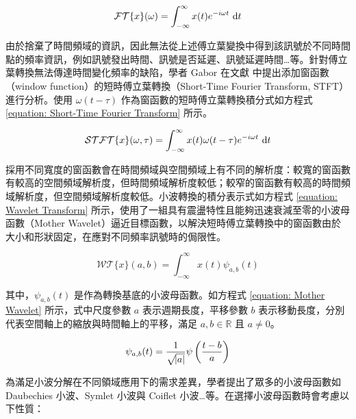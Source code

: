 \begin{equation}\label{equation: Fourier Transform}
  \mathcal{FT}\{ x \} (\omega) = \int_{-\infty}^{\infty} x(t) e^{-i \omega t} \, \mathop{}\!\mathrm{d} t
\end{equation}

由於捨棄了時間頻域的資訊，因此無法從上述傅立葉變換中得到該訊號於不同時間點的頻率資訊，例如訊號發出時間、訊號是否延遲、訊號延遲時間…等。針對傅立葉轉換無法傳達時間變化頻率的缺陷，學者 Gabor 在文獻 \cite{mallat1989theory} 中提出添加窗函數（window function）的短時傅立葉轉換（Short-Time Fourier Transform, STFT）進行分析。使用 $\omega(t - \tau)$ 作為窗函數的短時傅立葉轉換積分式如方程式 \eqref{equation: Short-Time Fourier Transform} 所示。

\begin{equation}\label{equation: Short-Time Fourier Transform}
  \mathcal{STFT}\{ x \} (\omega, \tau) = \int_{-\infty}^{\infty} x(t) \omega(t - \tau) e^{-i \omega t} \, \mathop{}\!\mathrm{d} t
\end{equation}

採用不同寬度的窗函數會在時間頻域與空間頻域上有不同的解析度：較寬的窗函數有較高的空間頻域解析度，但時間頻域解析度較低；較窄的窗函數有較高的時間頻域解析度，但空間頻域解析度較低。小波轉換的積分表示式如方程式 \eqref{equation: Wavelet Transform} 所示，使用了一組具有震盪特性且能夠迅速衰減至零的小波母函數（Mother Wavelet）逼近目標函數，以解決短時傅立葉轉換中的窗函數由於大小和形狀固定，在應對不同頻率訊號時的侷限性。

\begin{equation}\label{equation: Wavelet Transform}
  \mathcal{WT}\{ x \} (a, b) = \int_{-\infty}^{\infty} x(t) \psi_{a, b}(t)
\end{equation}

其中，$\psi_{a,b} (t)$ 是作為轉換基底的小波母函數。如方程式 \eqref{equation: Mother Wavelet} 所示，式中尺度參數 $a$ 表示週期長度，平移參數 $b$ 表示移動長度，分別代表空間軸上的縮放與時間軸上的平移，滿足 $a, b \in \mathbb{R}$ 且 $a \neq 0$。

\begin{equation}\label{equation: Mother Wavelet}
   \psi_{a, b}(t) = \frac{1}{\sqrt{\abs{a}}} \psi \left( \frac{t-b}{a} \right)
\end{equation}

為滿足小波分解在不同領域應用下的需求差異，學者提出了眾多的小波母函數如 Daubechies 小波、Symlet 小波與 Coiflet 小波…等。在選擇小波母函數時會考慮以下性質：

